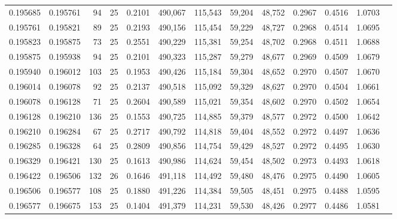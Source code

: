 \begin{tabular}{rrrrrrrrrrrrr}
0.195685 & 0.195761 &    94 &  25 &                                     0.2101 & 490,067 & 115,543 &  59,204 &  48,752 & 0.2967 & 0.4516 & 1.0703 \\
0.195761 & 0.195821 &    89 &  25 &                                     0.2193 & 490,156 & 115,454 &  59,229 &  48,727 & 0.2968 & 0.4514 & 1.0695 \\
0.195823 & 0.195875 &    73 &  25 &                                     0.2551 & 490,229 & 115,381 &  59,254 &  48,702 & 0.2968 & 0.4511 & 1.0688 \\
0.195875 & 0.195938 &    94 &  25 &                                     0.2101 & 490,323 & 115,287 &  59,279 &  48,677 & 0.2969 & 0.4509 & 1.0679 \\
0.195940 & 0.196012 &   103 &  25 &                                     0.1953 & 490,426 & 115,184 &  59,304 &  48,652 & 0.2970 & 0.4507 & 1.0670 \\
0.196014 & 0.196078 &    92 &  25 &                                     0.2137 & 490,518 & 115,092 &  59,329 &  48,627 & 0.2970 & 0.4504 & 1.0661 \\
0.196078 & 0.196128 &    71 &  25 &                                     0.2604 & 490,589 & 115,021 &  59,354 &  48,602 & 0.2970 & 0.4502 & 1.0654 \\
0.196128 & 0.196210 &   136 &  25 &                                     0.1553 & 490,725 & 114,885 &  59,379 &  48,577 & 0.2972 & 0.4500 & 1.0642 \\
0.196210 & 0.196284 &    67 &  25 &                                     0.2717 & 490,792 & 114,818 &  59,404 &  48,552 & 0.2972 & 0.4497 & 1.0636 \\
0.196285 & 0.196328 &    64 &  25 &                                     0.2809 & 490,856 & 114,754 &  59,429 &  48,527 & 0.2972 & 0.4495 & 1.0630 \\
0.196329 & 0.196421 &   130 &  25 &                                     0.1613 & 490,986 & 114,624 &  59,454 &  48,502 & 0.2973 & 0.4493 & 1.0618 \\
0.196422 & 0.196506 &   132 &  26 &                                     0.1646 & 491,118 & 114,492 &  59,480 &  48,476 & 0.2975 & 0.4490 & 1.0605 \\
0.196506 & 0.196577 &   108 &  25 &                                     0.1880 & 491,226 & 114,384 &  59,505 &  48,451 & 0.2975 & 0.4488 & 1.0595 \\
0.196577 & 0.196675 &   153 &  25 &                                     0.1404 & 491,379 & 114,231 &  59,530 &  48,426 & 0.2977 & 0.4486 & 1.0581 \\

\end{tabular}
